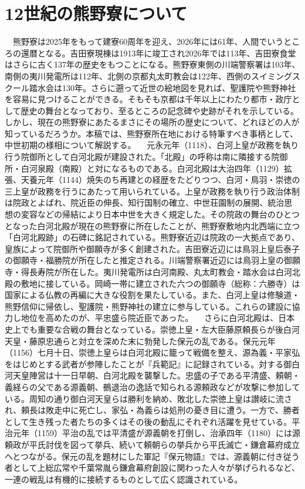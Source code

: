 
\section{12世紀の熊野寮について}
　熊野寮は2025年をもって建寮60周年を迎え、2026年には61年、人間でいうところの還暦となる。吉田寮現棟は1913年に竣工され2026年では113年、吉田寮食堂はさらに古く137年の歴史をもつことになる。熊野寮東側の川端警察署は103年、南側の夷川発電所は112年、北側の京都丸太町教会は122年、西側のスイミングスクール踏水会は130年。さらに遡って近世の絵地図を見れば、聖護院や熊野神社を容易に見つけることができる。そもそも京都は千年以上にわたり都市・政庁として歴史の舞台となっており、至るところの記念碑や史跡がそれを示している。しかし、現在の熊野寮にあたるまさにその場所の歴史について、どれほどの人が知っているだろうか。本稿では、熊野寮所在地における特筆すべき事柄として、中世初期の様相について解説する。
　元永元年（1118）、白河上皇が政務を執り行う院御所として白河北殿が建設された。「北殿」の呼称は南に隣接する院御所・白河泉殿（南殿）と対になるものである。白河北殿は大治四年（1129）拡張、天養元年（1144）焼失のち再建との経歴をたどりつつ、白河・鳥羽・崇徳の三上皇が政務を行うにあたって用いられている。上皇が政務を執り行う政治体制は院政とよばれ、院近臣の伸長、知行国制の確立、中世荘園制の展開、統治思想の変容などの帰結により日本中世を大きく規定した。その院政の舞台のひとつとなった白河北殿が現在の熊野寮に所在したことが、熊野寮敷地内北西端に立つ「白河北殿跡」の石碑に銘記されている。熊野寮近辺は院政の一大拠点であり、皇族によって院御所や御願寺が多く創建された。吉田寮近辺には鳥羽上皇后泰子の御願寺・福勝院が所在したと推定される。川端警察署近辺には鳥羽上皇の御願寺・得長寿院が所在した。夷川発電所は白河南殿、丸太町教会・踏水会は白河北殿の敷地に接している。岡崎一帯に建立された六つの御願寺（総称：六勝寺）は国家による仏教の再編に大きな役割を果たしている。また、白河上皇は修験道・熊野信仰に帰依し、聖護院・熊野神社の建立に参与している。これらの建設に協力し地位を高めたのが、平忠盛ら院近臣であった。
　さらに白河北殿は、日本史上でも重要な合戦の舞台となっている。崇徳上皇・左大臣藤原頼長らが後白河天皇・藤原忠通らと対立を深めた末に勃発した保元の乱である。保元元年（1156）七月十日、崇徳上皇らは白河北殿に籠って戦備を整え、源為義・平家弘をはじめとする武者が参陣したことが『兵範記』に記録されている。対する御白河天皇陣営は十一日早朝、白河北殿を襲撃した。忠盛の子である平清盛、頼朝・義経らの父である源義朝、鵺退治の逸話で知られる源頼政などが攻撃に参加している。周知の通り御白河天皇らは勝利を納め、敗北した崇徳上皇は讃岐に流され、頼長は敗走中に死亡し、家弘・為義らは処刑の憂き目に遭う。一方で、勝者として生き残った者たちの多くはその後の動乱にそれぞれ活躍を見せている。平治元年（1159）平治の乱では平清盛が源義朝を打倒し、治承四年（1180）には源頼政が平氏討伐を図って挙兵、続いて頼朝らの挙兵から平氏滅亡・鎌倉幕府成立へとつながる。保元の乱を題材にした軍記『保元物語』では、源義朝に付き従う者として上総広常や千葉常胤ら鎌倉幕府創設に関わった人々が挙げられるなど、一連の戦乱は有機的に接続するものとして広く認識されている。
